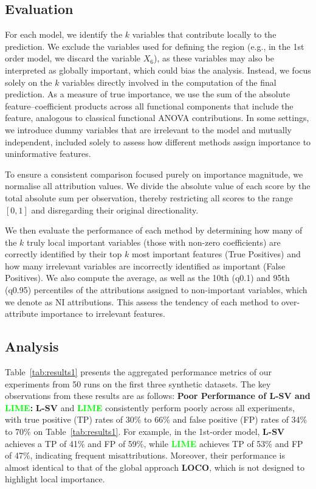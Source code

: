 \documentclass{article}
\theoremstyle{plain}
\theoremstyle{definition}
\theoremstyle{remark}
\newcommand{\loco}{\textcolor{loco}{\textbf{LOCO}}}
\newcommand{\lsv}{\textcolor{lsv}{\textbf{L-SV}}}
\newcommand{\lime}{\textcolor{lime}{\textbf{LIME}}}
\begin{document}
\subsection{Evaluation}
For each model, we identify the $k$ variables that contribute locally to the prediction. We exclude the variables used for defining the region (e.g., in the 1st order model, we discard the variable $X_{6}$), as these variables may also be interpreted as globally important, which could bias the analysis. Instead, we focus solely on the $k$ variables directly involved in the computation of the final prediction. As a measure of true importance, we use the sum of the absolute feature–coefficient products across all functional components that include the feature, analogous to classical functional ANOVA contributions. In some settings, we introduce dummy variables that are irrelevant to the model and mutually independent, included solely to assess how different methods assign importance to uninformative features.

To ensure a consistent comparison focused purely on importance magnitude, we normalise all attribution values. We divide the absolute value of each score by the total absolute sum per observation, thereby restricting all scores to the range $[0, 1]$ and disregarding their original directionality.


We then evaluate the performance of each method by determining how many of the $k$ truly local important variables (those with non-zero coefficients) are correctly identified by their top $k$ most important features (True Positives) and how many irrelevant variables are incorrectly identified as important (False Positives). We also compute the average, as well as the 10th (q0.1) and 95th (q0.95) percentiles of the attributions assigned to non-important variables, which we denote as NI attributions. This assess the tendency of each method to over-attribute importance to irrelevant features.


\subsection{Analysis} 
Table~\ref{tab:results1} presents the aggregated performance metrics of our experiments from 50 runs on the first three synthetic datasets.  The key observations from these results are as follows:
\textbf{Poor Performance of \lsv{} and \lime{}:}
\lsv{} and \lime{} consistently perform poorly across all experiments, with true positive (TP) rates of 30\% to 66\% and false positive (FP) rates of 34\% to 70\% on Table~\ref{tab:results1}. For example, in the 1st-order model, \lsv{} achieves a TP of 41\% and FP of 59\%, while \lime{} achieves TP of 53\% and FP of 47\%, indicating frequent misattributions. Moreover, their performance is almost identical to that of the global approach \loco{}, which is not designed to highlight local importance. 
\end{document}
